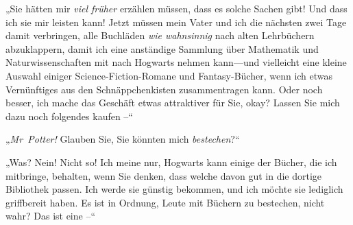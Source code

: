 „Sie hätten mir \emph{viel früher} erzählen müssen, dass es solche Sachen gibt! Und dass ich sie mir leisten kann! Jetzt müssen mein Vater und ich die nächsten zwei Tage damit verbringen, alle Buchläden \emph{wie wahnsinnig} nach alten Lehrbüchern abzuklappern, damit ich eine anständige Sammlung über Mathematik und Naturwissenschaften mit nach Hogwarts nehmen kann—und vielleicht eine kleine Auswahl einiger Science-Fiction-Romane und Fantasy-Bücher, wenn ich etwas Vernünftiges aus den Schnäppchenkisten zusammentragen kann. Oder noch besser, ich mache das Geschäft etwas attraktiver für Sie, okay? Lassen Sie mich dazu noch folgendes kaufen –“

„\emph{Mr~Potter!} Glauben Sie, Sie könnten mich \emph{bestechen}?“

„Was? Nein! Nicht so! Ich meine nur, Hogwarts kann einige der Bücher, die ich mitbringe, behalten, wenn Sie denken, dass welche davon gut in die dortige Bibliothek passen. Ich werde sie günstig bekommen, und ich möchte sie lediglich griffbereit haben. Es ist in Ordnung, Leute mit Büchern zu bestechen, nicht wahr? Das ist eine –“

